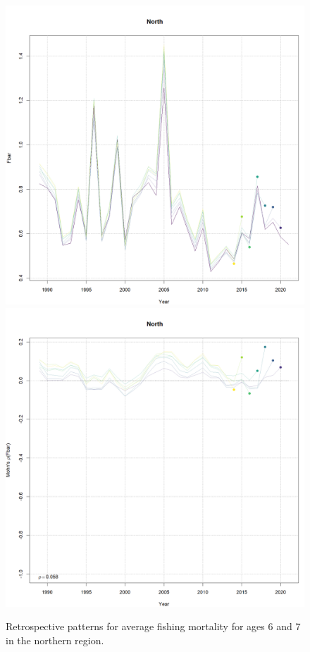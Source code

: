 \documentclass[
]{article}
\begin{document}
\begin{figure}

{\centering \includegraphics[width=0.65\linewidth]{../2023.RT.Runs/Run34/plots_png/retro/North_Fbar_retro} \includegraphics[width=0.65\linewidth]{../2023.RT.Runs/Run34/plots_png/retro/North_Fbar_retro_relative} 

}

\caption{Retrospective patterns for average fishing mortality for ages 6 and 7 in the northern region.}\label{fig:North-retro-F}
\end{figure}
\end{document}
